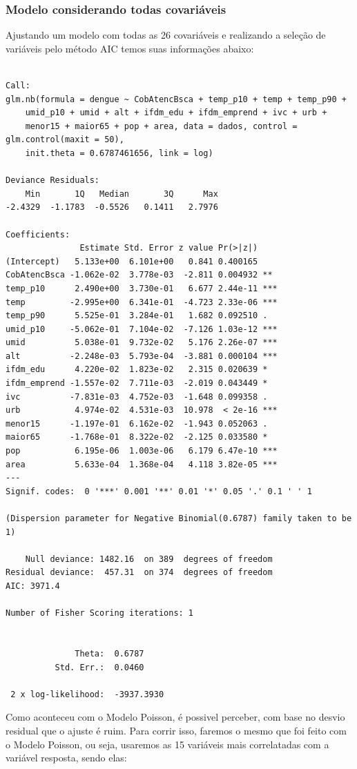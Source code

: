 \documentclass[12pt,a4paper]{article}\usepackage[]{graphicx}\usepackage[]{color}
\makeatletter
\newenvironment{kframe}{%
 \def\at@end@of@kframe{}%
 \ifinner\ifhmode%
  \def\at@end@of@kframe{\end{minipage}}%
  \begin{minipage}{\columnwidth}%
 \fi\fi%
 \def\FrameCommand##1{\hskip\@totalleftmargin \hskip-\fboxsep
 \colorbox{shadecolor}{##1}\hskip-\fboxsep
     \hskip-\linewidth \hskip-\@totalleftmargin \hskip\columnwidth}%
 \MakeFramed {\advance\hsize-\width
   \@totalleftmargin\z@ \linewidth\hsize
   \@setminipage}}%
 {\par\unskip\endMakeFramed%
 \at@end@of@kframe}
\newenvironment{knitrout}{}{} %
\makeatother
\begin{document}
\subsubsection{\textbf{Modelo considerando todas covariáveis}}
Ajustando um modelo com todas as 26 covariáveis e realizando a seleção de variáveis pelo método AIC temos suas informações abaixo:
\begin{knitrout}
\color{fgcolor}\begin{kframe}
\begin{verbatim}

Call:
glm.nb(formula = dengue ~ CobAtencBsca + temp_p10 + temp + temp_p90 + 
    umid_p10 + umid + alt + ifdm_edu + ifdm_emprend + ivc + urb + 
    menor15 + maior65 + pop + area, data = dados, control = glm.control(maxit = 50), 
    init.theta = 0.6787461656, link = log)

Deviance Residuals: 
    Min       1Q   Median       3Q      Max  
-2.4329  -1.1783  -0.5526   0.1411   2.7976  

Coefficients:
               Estimate Std. Error z value Pr(>|z|)    
(Intercept)   5.133e+00  6.101e+00   0.841 0.400165    
CobAtencBsca -1.062e-02  3.778e-03  -2.811 0.004932 ** 
temp_p10      2.490e+00  3.730e-01   6.677 2.44e-11 ***
temp         -2.995e+00  6.341e-01  -4.723 2.33e-06 ***
temp_p90      5.525e-01  3.284e-01   1.682 0.092510 .  
umid_p10     -5.062e-01  7.104e-02  -7.126 1.03e-12 ***
umid          5.038e-01  9.732e-02   5.176 2.26e-07 ***
alt          -2.248e-03  5.793e-04  -3.881 0.000104 ***
ifdm_edu      4.220e-02  1.823e-02   2.315 0.020639 *  
ifdm_emprend -1.557e-02  7.711e-03  -2.019 0.043449 *  
ivc          -7.831e-03  4.752e-03  -1.648 0.099358 .  
urb           4.974e-02  4.531e-03  10.978  < 2e-16 ***
menor15      -1.197e-01  6.162e-02  -1.943 0.052063 .  
maior65      -1.768e-01  8.322e-02  -2.125 0.033580 *  
pop           6.195e-06  1.003e-06   6.179 6.47e-10 ***
area          5.633e-04  1.368e-04   4.118 3.82e-05 ***
---
Signif. codes:  0 '***' 0.001 '**' 0.01 '*' 0.05 '.' 0.1 ' ' 1

(Dispersion parameter for Negative Binomial(0.6787) family taken to be 1)

    Null deviance: 1482.16  on 389  degrees of freedom
Residual deviance:  457.31  on 374  degrees of freedom
AIC: 3971.4

Number of Fisher Scoring iterations: 1


              Theta:  0.6787 
          Std. Err.:  0.0460 

 2 x log-likelihood:  -3937.3930 
\end{verbatim}
\end{kframe}
\end{knitrout}
Como aconteceu com o Modelo Poisson, é possivel perceber, com base no desvio residual que o ajuste é ruim. Para corrir isso, faremos o mesmo que foi feito com o Modelo Poisson, ou seja, usaremos as 15 variáveis mais correlatadas com a variável resposta, sendo elas:
\end{document}
